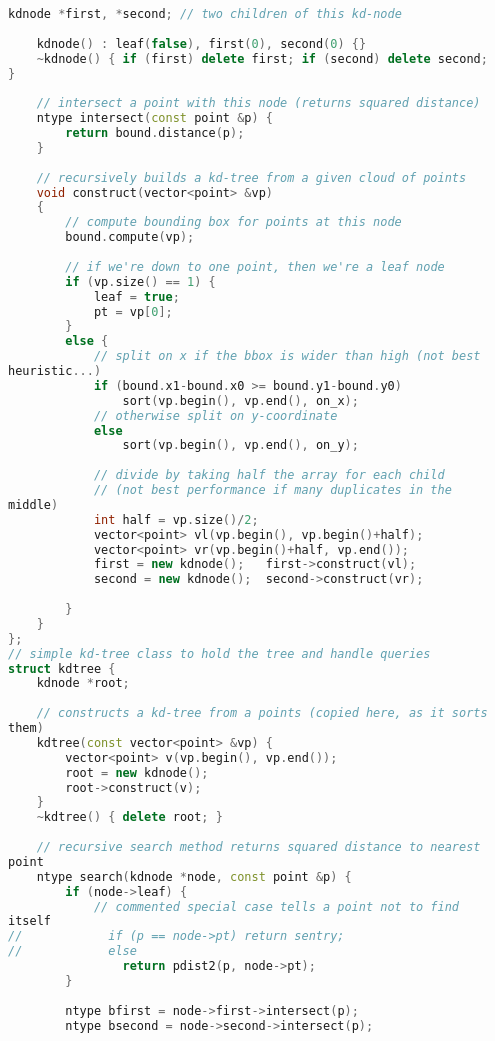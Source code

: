 \begin{lstlisting}[language=C++]
    kdnode *first, *second; // two children of this kd-node
    
    kdnode() : leaf(false), first(0), second(0) {}
    ~kdnode() { if (first) delete first; if (second) delete second; 
}
    
    // intersect a point with this node (returns squared distance)
    ntype intersect(const point &p) {
        return bound.distance(p);
    }
    
    // recursively builds a kd-tree from a given cloud of points
    void construct(vector<point> &vp)
    {
        // compute bounding box for points at this node
        bound.compute(vp);
        
        // if we're down to one point, then we're a leaf node
        if (vp.size() == 1) {
            leaf = true;
            pt = vp[0];
        }
        else {
            // split on x if the bbox is wider than high (not best 
heuristic...)
            if (bound.x1-bound.x0 >= bound.y1-bound.y0)
                sort(vp.begin(), vp.end(), on_x);
            // otherwise split on y-coordinate
            else
                sort(vp.begin(), vp.end(), on_y);
            
            // divide by taking half the array for each child
            // (not best performance if many duplicates in the 
middle)
            int half = vp.size()/2;
            vector<point> vl(vp.begin(), vp.begin()+half);
            vector<point> vr(vp.begin()+half, vp.end());
            first = new kdnode();   first->construct(vl);
            second = new kdnode();  second->construct(vr);          
  
        }
    }
};
// simple kd-tree class to hold the tree and handle queries
struct kdtree {
    kdnode *root;
    
    // constructs a kd-tree from a points (copied here, as it sorts 
them)
    kdtree(const vector<point> &vp) {
        vector<point> v(vp.begin(), vp.end());
        root = new kdnode();
        root->construct(v);
    }
    ~kdtree() { delete root; }
    
    // recursive search method returns squared distance to nearest 
point
    ntype search(kdnode *node, const point &p) {
        if (node->leaf) {
            // commented special case tells a point not to find 
itself
//            if (p == node->pt) return sentry;
//            else               
                return pdist2(p, node->pt);
        }
        
        ntype bfirst = node->first->intersect(p);
        ntype bsecond = node->second->intersect(p);
        

\end{lstlisting}
